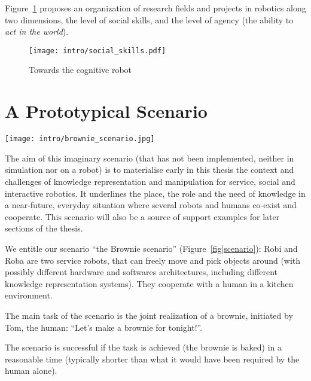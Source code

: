 Figure~\ref{fig|cognitive-robots} proposes an organization of research fields
and projects in robotics along two dimensions, the level of social skills, and
the level of agency (the ability to \emph{act in the world}).

\begin{figure}
    \centering
    \texttt{[image: intro/social\_skills.pdf]}
    \caption{Towards the cognitive robot}
    \label{fig|cognitive-robots}
\end{figure}



\section{A Prototypical Scenario}
\label{sect|scenario}

\begin{figure*}
	\centering
	\texttt{[image: intro/brownie\_scenario.jpg]}
	\caption{An illustration of the scenario, in the MORSE simulator}
	\label{fig|scenario}
\end{figure*}

The aim of this imaginary scenario (that has not been implemented, neither in
simulation nor on a robot) is to materialise early in this thesis the context
and challenges of knowledge representation and manipulation for service, social
and interactive robotics. It underlines the place, the role and the need of
knowledge in a near-future, everyday situation where several robots and humans
co-exist and cooperate. This scenario will also be a source of support examples
for later sections of the thesis.

We entitle our scenario ``the Brownie scenario'' (Figure~\ref{fig|scenario}):
Robi and Roba are two service robots, that can freely
move and pick objects around (with possibly different hardware and softwares
architectures, including different knowledge representation systems). They
cooperate with a human in a kitchen environment.

The main task of the scenario is the joint realization of a brownie, initiated
by Tom, the human: ``Let's make a brownie for tonight!''.

The scenario is successful if the task is achieved (the brownie is baked) in a
reasonable time (typically shorter than what it would have been required by the
human alone).

